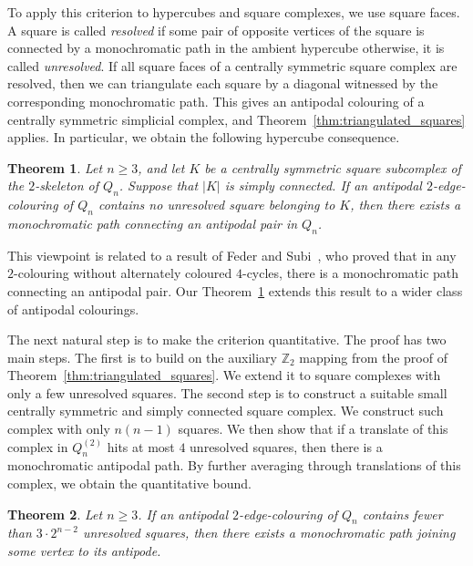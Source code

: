 \documentclass[12pt,UKenglish]{amsart}
\theoremstyle{plain}
\newtheorem{theorem}{Theorem}[section]
\theoremstyle{definition}
\theoremstyle{remark}
\begin{document}
To apply this criterion to hypercubes and square complexes, we use square faces. A square is called \emph{resolved} if some pair of opposite vertices of the square is connected by a monochromatic path in the ambient hypercube otherwise, it is called \emph{unresolved}. If all square faces of a centrally symmetric square complex are resolved, then we can triangulate each square by a diagonal witnessed by the corresponding monochromatic path. This gives an antipodal colouring of a centrally symmetric simplicial complex, and Theorem~\ref{thm:triangulated_squares} applies.
In particular, we obtain the following hypercube consequence.

\begin{theorem}\label{prop:unresolved_square_subcomplex}
Let \(n\ge3\), and let \(K\) be a centrally symmetric square subcomplex of the \(2\)-skeleton of \(Q_n\). Suppose that \(|K|\) is simply connected. If an antipodal \(2\)-edge-colouring of \(Q_n\) contains no unresolved square belonging to \(K\), then there exists a monochromatic path connecting an antipodal pair in \(Q_n\).
\end{theorem}
This viewpoint is related to a result of Feder and Subi~\cite{FederSubi}, who proved that in any $2$-colouring without alternately coloured $4$-cycles, there is a monochromatic path connecting an antipodal pair. Our Theorem~\ref{prop:unresolved_square_subcomplex} extends this result to a wider class of antipodal colourings.

The next natural step is to make the criterion quantitative. The proof has two main steps. The first is to build on the auxiliary $\mathbb Z_2$ mapping from the proof of Theorem~\ref{thm:triangulated_squares}. We extend it to square complexes with only a few unresolved squares. The second step is to construct a suitable small centrally symmetric and simply connected square complex. We construct such complex with only $n(n-1)$ squares. We then show that if a translate of this complex in $Q_n^{(2)}$ hits at most $4$ unresolved squares, then there is a monochromatic antipodal path. By further averaging through translations of this complex, we obtain the quantitative bound.

\begin{theorem}\label{quantitative_feder_subi}
Let $n\ge3$. If an antipodal $2$-edge-colouring of $Q_n$ contains fewer than $3\cdot2^{n-2}$ unresolved squares, then there exists a monochromatic path joining some vertex to its antipode.
\end{theorem}
\end{document}
